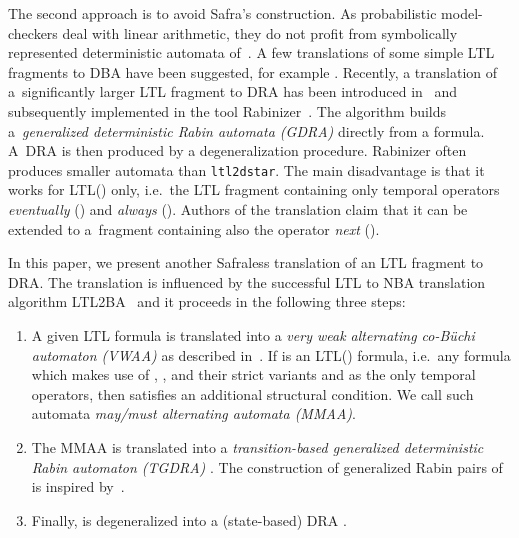 \documentclass{llncs}
\begin{document}
The second approach is to avoid Safra's construction.
As probabilistic model-checkers deal with linear arithmetic, 
they do not profit 
from symbolically represented deterministic automata
of~\cite{PPS06,MorgensternS08}.
A few translations of some simple LTL fragments to DBA have been
suggested, for example \cite{AT04}.  
Recently, a translation of
a~significantly larger LTL fragment to DRA has been introduced
in~\cite{KE12} and subsequently implemented in the tool
Rabinizer~\cite{GKE12}. The algorithm builds a~\emph{generalized
  deterministic Rabin automata (GDRA)} directly from a formula. A~DRA is
then produced by a degeneralization procedure. Rabinizer often produces
smaller automata than \texttt{ltl2dstar}. The main disadvantage is that
it works for LTL() only, i.e.~the LTL fragment containing only
temporal operators \emph{eventually} () and \emph{always}
(). Authors of the translation claim that it can be extended to
a~fragment containing also the operator \emph{next} ().

In this paper, we present another Safraless translation of an LTL
fragment to DRA. 
The translation is influenced by the successful LTL
to NBA translation algorithm LTL2BA~\cite{GO01}
and it proceeds in the following three steps:
\begin{enumerate}
\item A given LTL formula  is translated into a \emph{very weak
    alternating co-B\"uchi automaton (VWAA)}  as described
  in~\cite{GO01}. If  is an LTL() formula, i.e.~any
  formula which makes use of , , and their strict variants  and
   as the only temporal operators,
then  satisfies an additional structural condition. We call such
  automata \emph{may/must alternating automata (MMAA)}.
\item The MMAA  is translated into a \emph{transition-based
    generalized deterministic Rabin automaton (TGDRA)} .  The
  construction of generalized Rabin pairs of  is inspired
  by~\cite{KE12}.
\item Finally,  is degeneralized into a (state-based) DRA .  \end{enumerate}
\end{document}
